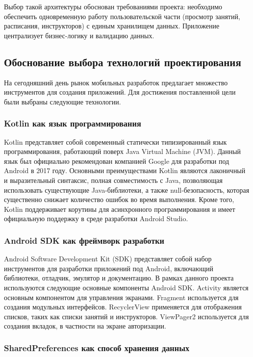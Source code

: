 Выбор такой архитектуры обоснован требованиями проекта: необходимо обеспечить одновременную работу пользовательской части (просмотр занятий, расписания, инструкторов) с единым хранилищем данных. Приложение централизует бизнес-логику и валидацию данных.

\subsection{Обоснование выбора технологий проектирования}

На сегодняшний день рынок мобильных разработок предлагает множество инструментов для создания приложений. Для достижения поставленной цели были выбраны следующие технологии.

\subsubsection{Kotlin как язык программирования}

Kotlin представляет собой современный статически типизированный язык программирования, работающий поверх Java Virtual Machine (JVM). Данный язык был официально рекомендован компанией Google для разработки под Android в 2017 году. Основными преимуществами Kotlin являются лаконичный и выразительный синтаксис, полная совместимость с Java, позволяющая использовать существующие Java-библиотеки, а также null-безопасность, которая существенно снижает количество ошибок во время выполнения. Кроме того, Kotlin поддерживает корутины для асинхронного программирования и имеет официальную поддержку в среде разработки Android Studio.

\subsubsection{Android SDK как фреймворк разработки}

Android Software Development Kit (SDK) представляет собой набор инструментов для разработки приложений под Android, включающий библиотеки, отладчик, эмулятор и документацию. В рамках данного проекта используются следующие основные компоненты Android SDK. Activity является основным компонентом для управления экранами. Fragment используется для создания модульных интерфейсов. RecyclerView применяется для отображения списков, таких как списки занятий и инструкторов. ViewPager2 используется для создания вкладок, в частности на экране авторизации.

\subsubsection{SharedPreferences как способ хранения данных}

